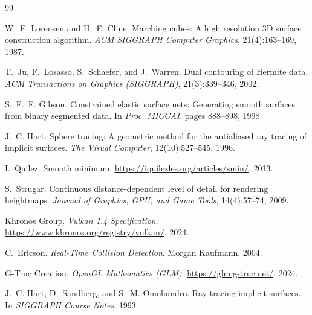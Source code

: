 \begin{thebibliography}{99}

W.~E. Lorensen and H.~E. Cline.
\newblock Marching cubes: A high resolution 3D surface construction algorithm.
\newblock \emph{ACM SIGGRAPH Computer Graphics}, 21(4):163--169, 1987.

T.~Ju, F.~Losasso, S.~Schaefer, and J.~Warren.
\newblock Dual contouring of Hermite data.
\newblock \emph{ACM Transactions on Graphics (SIGGRAPH)}, 21(3):339--346, 2002.

S.~F.~F. Gibson.
\newblock Constrained elastic surface nets: Generating smooth surfaces from
  binary segmented data.
\newblock In \emph{Proc. MICCAI}, pages 888--898, 1998.

J.~C. Hart.
\newblock Sphere tracing: A geometric method for the antialiased ray tracing of
  implicit surfaces.
\newblock \emph{The Visual Computer}, 12(10):527--545, 1996.

I.~Quilez.
\newblock Smooth minimum.
\newblock \url{https://iquilezles.org/articles/smin/}, 2013.

S.~Strugar.
\newblock Continuous distance-dependent level of detail for rendering
  heightmaps.
\newblock \emph{Journal of Graphics, GPU, and Game Tools}, 14(4):57--74, 2009.

Khronos Group.
\newblock \emph{Vulkan 1.4 Specification}.
\newblock \url{https://www.khronos.org/registry/vulkan/}, 2024.

C.~Ericson.
\newblock \emph{Real-Time Collision Detection}.
\newblock Morgan Kaufmann, 2004.

G-Truc Creation.
\newblock \emph{OpenGL Mathematics (GLM)}.
\newblock \url{https://glm.g-truc.net/}, 2024.

J.~C. Hart, D.~Sandberg, and S.~M. Omohundro.
\newblock Ray tracing implicit surfaces.
\newblock In \emph{SIGGRAPH Course Notes}, 1993.

\end{thebibliography}
